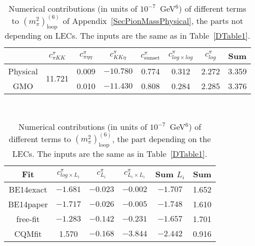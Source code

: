 \documentclass[12pt,a4paper]{article}
\begin{document}
\begin{table}
\centering
\begin{tabular}{| c || c c c || c c c | c | }
\hline
& $c^\pi_{\pi KK}$ & $c^\pi_{\pi\eta\eta}$ & $c^\pi_{KK\eta}$ & ${c}^{\pi}_{\text{sunset}}$ & $c^{\pi}_{log \times log}$ & $c^{\pi}_{log}$  & Sum \\
\hline
\hline
Physical & \multirow{2}{*}{11.721} & 0.009 & $-10.780$ & 0.774 & 0.312 & 2.272 & 3.359 \\
GMO & & 0.010 & $-11.430$ & 0.808 & 0.284 & 2.285 & 3.376 \\[1ex]
\hline
\end{tabular} \\
\caption{Numerical contributions (in units of $10^{-7}$~GeV$^{6}$) of different terms to $\left( {m}_{\pi}^2 \right)^{(6)}_{\text{loop}}$ of Appendix~\ref{SecPionMassPhysical}, the parts not depending on LECs.  The inputs are the same as in Table~\ref{DTable1}.}
\label{CTable1}
\end{table}

\begin{table}
\centering
\begin{tabular}{| c || c c c | c | c |}
\hline
Fit & $c^{\pi}_{log \times L_i}$ & $c^\pi_{L_i}$ & $ c^\pi_{L_i\times L_i}$ & Sum $L_i$ & Sum \\ 
\hline
\hline
BE14exact &  $-1.681$ & $-0.023$ & $-0.002$ &  $-1.707$ & 1.652 \\
BE14paper &  $-1.717$ & $-0.026$ & $-0.005$ &  $-1.748$ & 1.610 \\
free-fit  &  $-1.283$ & $-0.142$ & $-0.231$ &  $-1.657$ & 1.701 \\
CQMfit    &  1.570 & $-0.168$ & $-3.844$&   $-2.442$ & 0.916
\\ [1ex]
\hline
\end{tabular} \\
\caption{Numerical contributions (in units of $10^{-7}$~GeV$^{6}$) of different terms to $\left( {m}_{\pi}^2 \right)^{(6)}_{\text{loop}}$, the part depending on the LECs. The inputs are the same as in Table~\ref{DTable1}.}
\label{CTable}
\end{table}
\end{document}
